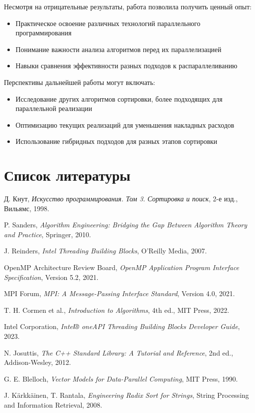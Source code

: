 \documentclass[a4paper,12pt]{article}
\begin{document}
Несмотря на отрицательные результаты, работа позволила получить ценный опыт:
\begin{itemize}
    \item Практическое освоение различных технологий параллельного программирования
    \item Понимание важности анализа алгоритмов перед их параллелизацией
    \item Навыки сравнения эффективности разных подходов к распараллеливанию
\end{itemize}

Перспективы дальнейшей работы могут включать:
\begin{itemize}
    \item Исследование других алгоритмов сортировки, более подходящих для параллельной реализации
    \item Оптимизацию текущих реализаций для уменьшения накладных расходов
    \item Использование гибридных подходов для разных этапов сортировки
\end{itemize}

\newpage

\section{Список литературы}
\begin{thebibliography}{9}
  Д. Кнут, \emph{Искусство программирования. Том 3. Сортировка и поиск}, 2-е изд., Вильямс, 1998.

  P. Sanders, \emph{Algorithm Engineering: Bridging the Gap Between Algorithm Theory and Practice}, Springer, 2010.

  J. Reinders, \emph{Intel Threading Building Blocks}, O'Reilly Media, 2007.

  OpenMP Architecture Review Board, \emph{OpenMP Application Program Interface Specification}, Version 5.2, 2021.

  MPI Forum, \emph{MPI: A Message-Passing Interface Standard}, Version 4.0, 2021.

  T. H. Cormen et al., \emph{Introduction to Algorithms}, 4th ed., MIT Press, 2022.

  Intel Corporation, \emph{Intel® oneAPI Threading Building Blocks Developer Guide}, 2023.

  N. Josuttis, \emph{The C++ Standard Library: A Tutorial and Reference}, 2nd ed., Addison-Wesley, 2012.

  G. E. Blelloch, \emph{Vector Models for Data-Parallel Computing}, MIT Press, 1990.

  J. Kärkkäinen, T. Rantala, \emph{Engineering Radix Sort for Strings}, String Processing and Information Retrieval, 2008.
\end{thebibliography}
\newpage
\end{document}

